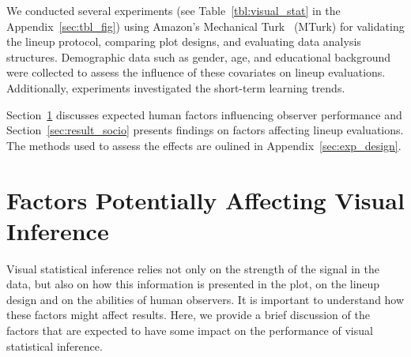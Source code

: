 \documentclass[10pt]{article}\usepackage[]{graphicx}\usepackage[]{xcolor}
\begin{document}
We conducted several experiments (see Table~\ref{tbl:visual_stat} in the Appendix~\ref{sec:tbl_fig}) using Amazon's Mechanical Turk~\citep{turk} (MTurk) for validating the lineup protocol, comparing plot designs, and evaluating data analysis structures. Demographic data such as gender, age, and educational background were collected to assess the influence of these covariates on lineup evaluations. Additionally, experiments investigated the short-term learning trends.

Section~\ref{sec:factor_performance} discusses expected human factors influencing observer performance and Section~\ref{sec:result_socio} presents findings on factors affecting lineup evaluations. The methods used to assess the effects are oulined in Appendix~\ref{sec:exp_design}. 



\section{Factors Potentially Affecting Visual Inference} \label{sec:factor_performance} 

Visual statistical inference relies not only on the strength of the signal in the data, but also on how this information is presented in the plot, on the lineup design and on the abilities of human observers. It is important to understand how these factors might affect results.  Here, we provide a brief discussion %
of the factors that are expected to have some impact on the performance of visual statistical inference.  
\end{document}
